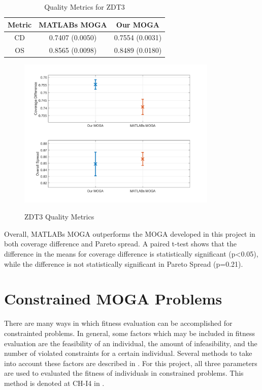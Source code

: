 \documentclass{article}
\begin{document}
\begin{table}[H]
\caption{Quality Metrics for ZDT3} 
\centering 
\begin{tabular}{|c|c|c|} 
\hline 
Metric & MATLABs MOGA & Our MOGA \\ \hline
CD & 0.7407 (0.0050) & 0.7554 (0.0031) \\ \hline
OS & 0.8565 (0.0098) & 0.8489 (0.0180) \\ \hline
\end{tabular}
\label{tab:ZDT3} 
\end{table}
\begin{figure}[H]
  \caption{ZDT3 Quality Metrics}
  \centering
  \includegraphics[width=0.85\textwidth]{ZDT3_QM.png}  
  \label{fig:ZDT3_QM}
\end{figure}

\noindent Overall, MATLABs MOGA outperforms the MOGA developed in this project in both coverage difference and Pareto spread. A paired t-test shows that the difference in the means for coverage difference is statistically significant (p<0.05), while the difference is not statistically significant in Pareto Spread (p=0.21). \newline

\section{Constrained MOGA Problems}

There are many ways in which fitness evaluation can be accomplished for constrainted problems. In general, some factors which may be included in fitness evaluation are the feasibility of an individual, the amount of infeasibility, and the number of violated constraints for a certain individual. Several methods to take into account these factors are described in \cite{kurpati2002constraint}. For this project, all three parameters are used to evaluated the fitness of individuals in constrained problems. This method is denoted at CH-I4 in \cite{kurpati2002constraint}. \newline
\end{document}
